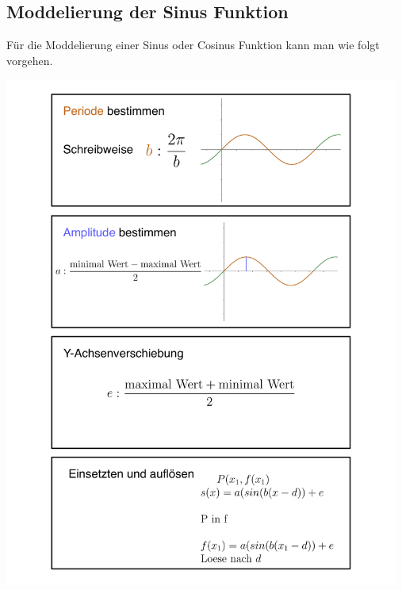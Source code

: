 \subsection{Moddelierung der Sinus Funktion}
Für die Moddelierung einer Sinus oder Cosinus Funktion kann man wie folgt vorgehen.

\includegraphics[width=13cm]{Media/Modelierung_von_Sinus_Algorythmus}

